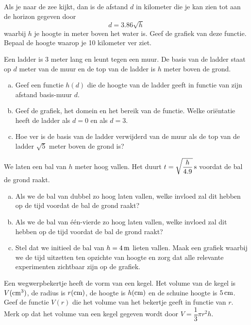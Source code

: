 \documentclass[12pt,twoside]{article}
\begin{document}
\begin{oefening} %
Als je naar de zee kijkt, dan is de afstand $d$ in kilometer die je kan zien tot aan de horizon gegeven door
$$d=3.86\sqrt{h}$$
waarbij $h$ je hoogte in meter boven het water is. Geef de grafiek van deze functie. Bepaal de hoogte waarop je 10 kilometer ver ziet.
\end{oefening}

\begin{oefening} %
Een ladder is 3 meter lang en leunt tegen een muur. De basis van de ladder staat op $d$ meter van de muur en de top van de ladder is $h$ meter boven de grond.
\begin{enumerate}[(a)]
  \item Geef een functie $h(d)$ die de hoogte van de ladder geeft in functie van zijn afstand basis-muur $d$.
  \item Geef de grafiek, het domein en het bereik van de functie. Welke oriëntatie heeft de ladder als $d=0$ en als $d=3$.
  \item Hoe ver is de basis van de ladder verwijderd van de muur als de top van de ladder $\sqrt{5}$ meter boven de grond is?
\end{enumerate}
\end{oefening}

\begin{oefening} %
We laten een bal van $h$ meter hoog vallen. Het duurt $t=\sqrt{\dfrac{h}{4.9}}\s$ voordat de bal de grond raakt.
\begin{enumerate}[(a)]
  \item Als we de bal van dubbel zo hoog laten vallen, welke invloed zal dit hebben op de tijd voordat de bal de grond raakt?
  \item Als we de bal van één-vierde zo hoog laten vallen, welke invloed zal dit hebben op de tijd voordat de bal de grond raakt?
  \item Stel dat we initieel de bal van $h=4\m$ lieten vallen. Maak een grafiek waarbij we de tijd uitzetten ten opzichte van hoogte en zorg dat alle relevante experimenten zichtbaar zijn op de grafiek.
\end{enumerate}
\end{oefening}

\begin{oefening} %
Een wegwerpbekertje heeft de vorm van een kegel. Het volume van de kegel is $V (\cm^3)$, de radius is $r (\cm)$, de hoogte is $h (\cm)$ en de schuine hoogte is $5 \cm$. Geef de functie $V(r)$ die het volume van het bekertje geeft in functie van $r$. Merk op dat het volume van een kegel gegeven wordt door $V=\dfrac{1}{3}\pi r^2 h$.
\end{oefening}



\end{document}
